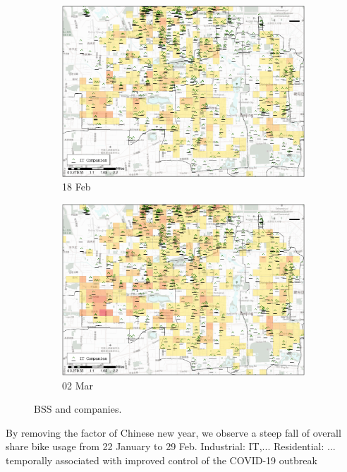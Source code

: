 \documentclass[preprints,ijgi,submit,moreauthors]{Definitions/mdpi}
\begin{document}
\begin{figure}[H]
    \vspace{6pt}
    \begin{subfigure}{.45\textwidth}
        \includegraphics[width=\textwidth]{Figures/Relation_with_POIs/POI_compD2020_02_18.eps}
        \caption{18 Feb}
    \end{subfigure}
        \begin{subfigure}{.45\textwidth}
        \includegraphics[width=\textwidth]{Figures/Relation_with_POIs/POI_compD2020_03_02.eps}
        \caption{02 Mar}
    \end{subfigure}
    \caption{BSS and companies.}
    \label{fig:BSS_companies}
\end{figure}

By removing the factor of Chinese new year, we observe a steep fall of overall share bike usage from 22 January to 29 Feb.
Industrial: IT,...
Residential: ...
temporally associated with improved control of the COVID-19 outbreak
\end{document}
